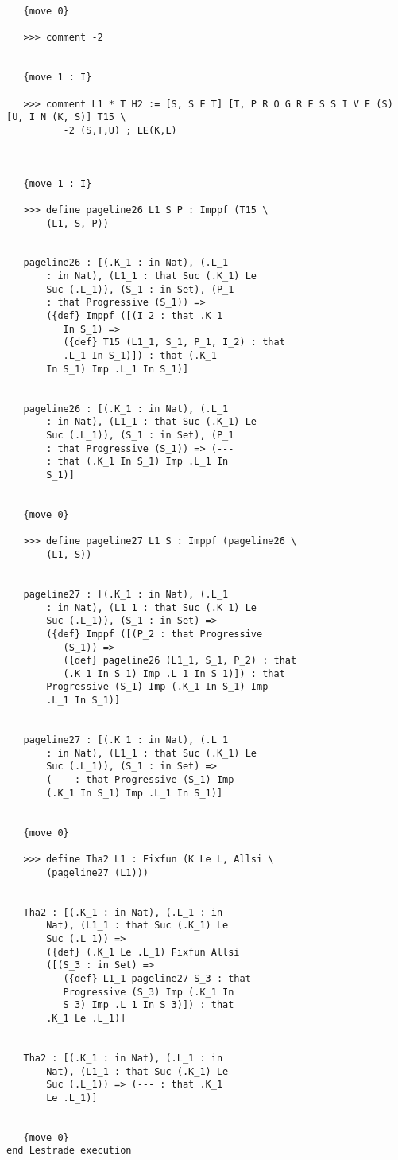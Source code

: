\documentclass{article}
\begin{document}
\begin{verbatim}
   {move 0}

   >>> comment -2


   {move 1 : I}

   >>> comment L1 * T H2 := [S, S E T] [T, P R O G R E S S I V E (S) [U, I N (K, S)] T15 \
          -2 (S,T,U) ; LE(K,L)



   {move 1 : I}

   >>> define pageline26 L1 S P : Imppf (T15 \
       (L1, S, P))


   pageline26 : [(.K_1 : in Nat), (.L_1 
       : in Nat), (L1_1 : that Suc (.K_1) Le 
       Suc (.L_1)), (S_1 : in Set), (P_1 
       : that Progressive (S_1)) => 
       ({def} Imppf ([(I_2 : that .K_1 
          In S_1) => 
          ({def} T15 (L1_1, S_1, P_1, I_2) : that 
          .L_1 In S_1)]) : that (.K_1 
       In S_1) Imp .L_1 In S_1)]


   pageline26 : [(.K_1 : in Nat), (.L_1 
       : in Nat), (L1_1 : that Suc (.K_1) Le 
       Suc (.L_1)), (S_1 : in Set), (P_1 
       : that Progressive (S_1)) => (--- 
       : that (.K_1 In S_1) Imp .L_1 In 
       S_1)]


   {move 0}

   >>> define pageline27 L1 S : Imppf (pageline26 \
       (L1, S))


   pageline27 : [(.K_1 : in Nat), (.L_1 
       : in Nat), (L1_1 : that Suc (.K_1) Le 
       Suc (.L_1)), (S_1 : in Set) => 
       ({def} Imppf ([(P_2 : that Progressive 
          (S_1)) => 
          ({def} pageline26 (L1_1, S_1, P_2) : that 
          (.K_1 In S_1) Imp .L_1 In S_1)]) : that 
       Progressive (S_1) Imp (.K_1 In S_1) Imp 
       .L_1 In S_1)]


   pageline27 : [(.K_1 : in Nat), (.L_1 
       : in Nat), (L1_1 : that Suc (.K_1) Le 
       Suc (.L_1)), (S_1 : in Set) => 
       (--- : that Progressive (S_1) Imp 
       (.K_1 In S_1) Imp .L_1 In S_1)]


   {move 0}

   >>> define Tha2 L1 : Fixfun (K Le L, Allsi \
       (pageline27 (L1)))


   Tha2 : [(.K_1 : in Nat), (.L_1 : in 
       Nat), (L1_1 : that Suc (.K_1) Le 
       Suc (.L_1)) => 
       ({def} (.K_1 Le .L_1) Fixfun Allsi 
       ([(S_3 : in Set) => 
          ({def} L1_1 pageline27 S_3 : that 
          Progressive (S_3) Imp (.K_1 In 
          S_3) Imp .L_1 In S_3)]) : that 
       .K_1 Le .L_1)]


   Tha2 : [(.K_1 : in Nat), (.L_1 : in 
       Nat), (L1_1 : that Suc (.K_1) Le 
       Suc (.L_1)) => (--- : that .K_1 
       Le .L_1)]


   {move 0}
end Lestrade execution
\end{verbatim}
\end{document}
